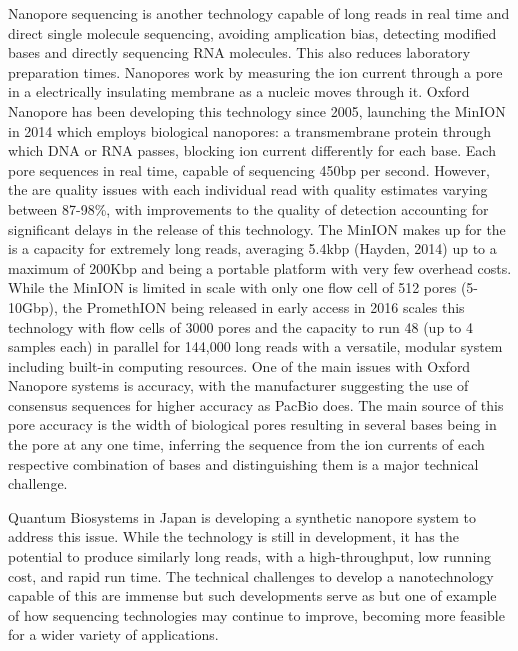 Nanopore sequencing is another technology capable of long reads in real time and direct single molecule sequencing, avoiding amplication bias, detecting modified bases and directly sequencing RNA molecules. This also reduces laboratory preparation times. Nanopores work by measuring the ion current through a pore in a electrically insulating membrane as a nucleic moves through it. Oxford Nanopore has been developing this technology since 2005, launching the MinION in 2014 which employs biological nanopores: a transmembrane protein through which DNA or RNA passes, blocking ion current differently for each base. Each pore sequences in real time, capable of sequencing 450bp per second. However, the are quality issues with each individual read with quality estimates varying between 87-98\%, with improvements to the quality of detection accounting for significant delays in the release of this technology. The MinION makes up for the is a capacity for extremely long reads, averaging 5.4kbp (Hayden, 2014) up to a maximum of 200Kbp and being a portable platform with very few overhead costs. While the MinION is limited in scale with only one flow cell of 512 pores (5-10Gbp), the PromethION being released in early access in 2016 scales this technology with flow cells of 3000 pores and the capacity to run 48 (up to 4 samples each) in parallel for 144,000 long reads with a versatile, modular system including built-in computing resources. One of the main issues with Oxford Nanopore systems is accuracy, with the manufacturer suggesting the use of consensus sequences for higher accuracy as PacBio does. The main source of this pore accuracy is the width of biological pores resulting in several bases being in the pore at any one time, inferring the sequence from the ion currents of each respective combination of bases and distinguishing them is a major technical challenge.

Quantum Biosystems in Japan is developing a synthetic nanopore system to address this issue. While the technology is still in development, it has the potential to produce similarly long reads, with a high-throughput, low running cost, and rapid run time. The technical challenges to develop a nanotechnology capable of this are immense but such developments serve as but one of example of how sequencing technologies may continue to improve, becoming more feasible for a wider variety of applications.


